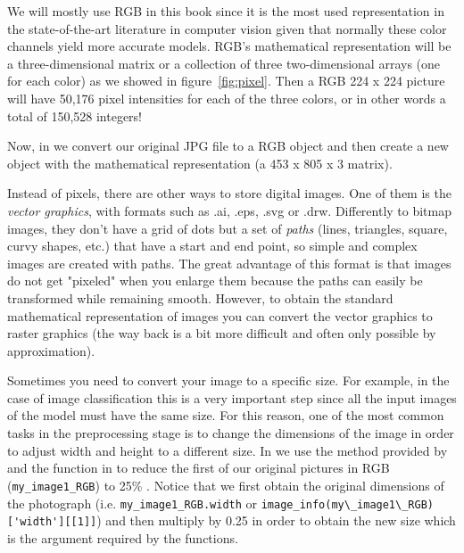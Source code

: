 We will mostly use RGB in this book since it is the most used representation in the state-of-the-art literature in computer vision given that normally these color channels yield more accurate models. RGB's mathematical representation will be a three-dimensional matrix or a collection of three two-dimensional arrays (one for each color) as we showed in figure~\ref{fig:pixel}. Then a RGB 224 x 224 picture will have 50,176 pixel intensities for each of the three colors, or in other words a total of 150,528 integers!

Now, in  we convert our original JPG file to a RGB object and then create a new object with the mathematical representation (a 453 x 805 x 3 matrix).


Instead of pixels, there are other ways to store digital images. One of them is the \textit{vector graphics}, with formats such as .ai, .eps, .svg or .drw. Differently to bitmap images, they don't have a grid of dots but a set of \textit{paths} (lines, triangles, square, curvy shapes, etc.) that have a start and end point, so simple and complex images are created with paths. The great advantage of this format is that images do not get "pixeled" when you enlarge them because the paths can easily be transformed 	while remaining smooth. However, to obtain the standard mathematical representation of images you can convert the vector graphics to raster graphics (the way back is a bit more difficult and often only possible by approximation).

Sometimes you need to convert your image to a specific size. For example, in the case of image classification this is a very important step since all the input images of the model must have the same size. For this reason, one of the most common tasks in the preprocessing stage is to change the dimensions of the image in order to adjust width and height to a different size. In  we use the  method provided by  and the  function in  to reduce the first of our original pictures in RGB (\texttt{my\_image1\_RGB}) to 25\% . Notice that we first obtain the original dimensions of the photograph (i.e. \texttt{my\_image1\_RGB.width} or \verb|image_info(my\_image1\_RGB)['width'][[1]]|) and then multiply by 0.25 in order to obtain the new size which is the argument required by the functions.


